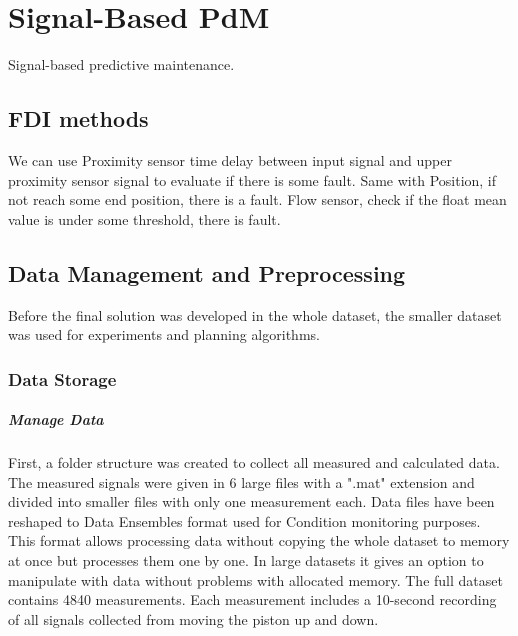 %




\chapter{Signal-Based PdM}
Signal-based predictive maintenance.



\section{FDI methods}
We can use Proximity sensor time delay between input signal and upper
proximity sensor signal to evaluate if there is some fault.
Same with Position, if not reach some end position, there is a fault.
Flow sensor, check if the float mean value is under some threshold, there
is fault.

\section{Data Management and Preprocessing}
Before the final solution was developed in the whole dataset, the smaller
dataset was used for experiments and planning algorithms. 

\subsection{Data Storage}
\paragraph{Manage Data}

First, a folder structure was created to collect all measured and
calculated data. The measured signals were given in 6 large files with a
".mat" extension and divided into smaller files with only one measurement
each.  Data files have been reshaped to Data Ensembles \cite{} format used
for Condition monitoring purposes. This format allows processing data
without copying the whole dataset to memory at once but processes them one
by one. In large datasets it gives an option to manipulate with data
without problems with allocated memory.  The full dataset contains 4840
measurements. Each measurement includes a 10-second recording of all
signals collected from moving the piston up and down.

